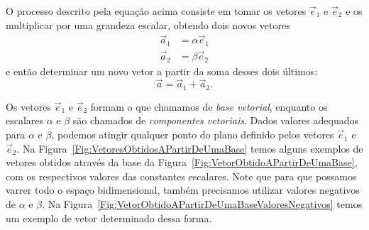 \noindent{}O processo descrito pela equação acima consiste em tomar os vetores $\vec{e}_1$ e $\vec{e}_2$ e os multiplicar por uma grandeza escalar, obtendo dois novos vetores
\begin{align}
    \vec{a}_1 &= \alpha\vec{e}_1 \\
    \vec{a}_2 &= \beta\vec{e}_2
\end{align}
%
e então determinar um novo vetor a partir da soma desses dois últimos:
\begin{equation}
    \vec{a} = \vec{a}_1 + \vec{a}_2.
\end{equation}

Os vetores $\vec{e}_1$ e $\vec{e}_2$ formam o que chamamos de \emph{base vetorial}, enquanto os escalares $\alpha$ e $\beta$ são chamados de \emph{componentes vetoriais}. Dados valores adequados para $\alpha$ e $\beta$, podemos atingir qualquer ponto do plano definido pelos vetores $\vec{e}_1$ e $\vec{e}_2$. Na Figura~\ref{Fig:VetoresObtidosAPartirDeUmaBase} temos alguns exemplos de vetores obtidos através da base da Figura~\ref{Fig:VetorObtidoAPartirDeUmaBase}, com os respectivos valores das constantes escalares. Note que para que possamos varrer todo o espaço bidimensional, também precisamos utilizar valores negativos de $\alpha$ e $\beta$. Na Figura~\ref{Fig:VetorObtidoAPartirDeUmaBaseValoresNegativos} temos um exemplo de vetor determinado dessa forma.


